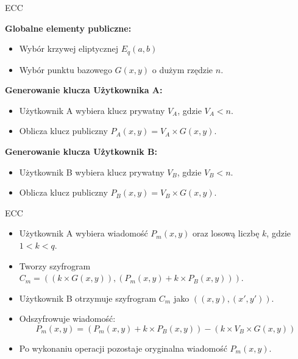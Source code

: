 \begin{frame}{ECC}

    \textbf{Globalne elementy publiczne:}
    \begin{itemize}
        \item Wybór krzywej eliptycznej $E_q(a, b)$
        \item Wybór punktu bazowego $G(x, y)$ o dużym rzędzie $n$.
    \end{itemize}

    \textbf{Generowanie klucza Użytkownika A:}
    \begin{itemize}
        \item Użytkownik A wybiera klucz prywatny $V_A$, gdzie $V_A < n$.
        \item Oblicza klucz publiczny $P_A(x, y) = V_A \times G(x, y)$.
    \end{itemize}

    \textbf{Generowanie klucza Użytkownik B:}
    \begin{itemize}
        \item Użytkownik B wybiera klucz prywatny $V_B$, gdzie $V_B < n$.
        \item Oblicza klucz publiczny $P_B(x, y) = V_B \times G(x, y)$.
    \end{itemize}

\end{frame}


\begin{frame}{ECC}

    \begin{itemize}
        \item Użytkownik A wybiera wiadomość $P_m(x, y)$ oraz losową liczbę $k$, gdzie $1 < k < q$.
        \item Tworzy szyfrogram $C_m = ((k \times G(x, y)), (P_m(x, y) + k \times P_B(x, y)))$.
    \end{itemize}
    \begin{itemize}
        \item Użytkownik B otrzymuje szyfrogram $C_m$ jako $((x, y), (x', y'))$.
        \item Odszyfrowuje wiadomość:
        \[
            P_m(x, y) = (P_m(x, y) + k \times P_B(x, y)) - (k \times V_B \times G(x, y))
        \]
        \item Po wykonaniu operacji pozostaje oryginalna wiadomość $P_m(x, y)$.
    \end{itemize}


\end{frame}
